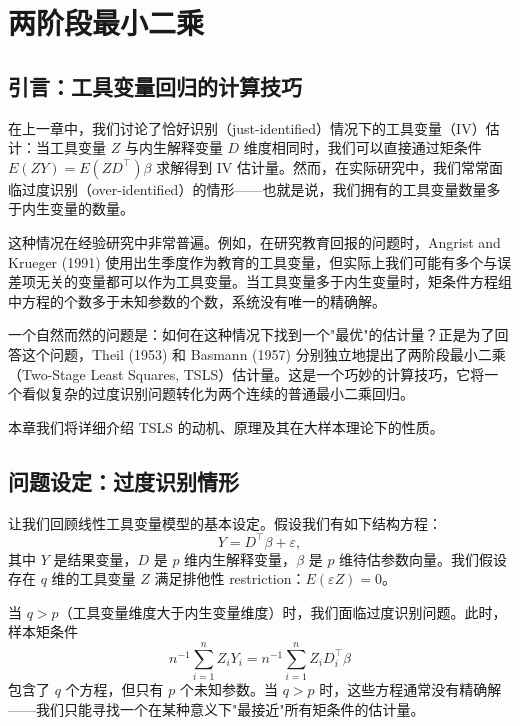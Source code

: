 \chapter{两阶段最小二乘}\label{ch:23}\label{chap:TSLS}

\section{引言：工具变量回归的计算技巧}\label{sec:TSLS-intro}

在上一章中，我们讨论了恰好识别（just-identified）情况下的工具变量（IV）估计：当工具变量 $Z$ 与内生解释变量 $D$ 维度相同时，我们可以直接通过矩条件 $E(ZY)=E(ZD^{\top})\beta$ 求解得到 IV 估计量。然而，在实际研究中，我们常常面临过度识别（over-identified）的情形——也就是说，我们拥有的工具变量数量多于内生变量的数量。

这种情况在经验研究中非常普遍。例如，在研究教育回报的问题时，Angrist and Krueger (1991) 使用出生季度作为教育的工具变量，但实际上我们可能有多个与误差项无关的变量都可以作为工具变量。当工具变量多于内生变量时，矩条件方程组中方程的个数多于未知参数的个数，系统没有唯一的精确解。

一个自然而然的问题是：如何在这种情况下找到一个"最优"的估计量？正是为了回答这个问题，Theil (1953) 和 Basmann (1957) 分别独立地提出了两阶段最小二乘（Two-Stage Least Squares, TSLS）估计量。这是一个巧妙的计算技巧，它将一个看似复杂的过度识别问题转化为两个连续的普通最小二乘回归。

本章我们将详细介绍 TSLS 的动机、原理及其在大样本理论下的性质。

\section{问题设定：过度识别情形}\label{sec:over-identified}

让我们回顾线性工具变量模型的基本设定。假设我们有如下结构方程：
\begin{equation}
Y = D^{\top}\beta + \varepsilon, \label{eq:23.1}
\end{equation}
其中 $Y$ 是结果变量，$D$ 是 $p$ 维内生解释变量，$\beta$ 是 $p$ 维待估参数向量。我们假设存在 $q$ 维的工具变量 $Z$ 满足排他性 restriction：$E(\varepsilon Z)=0$。

当 $q>p$（工具变量维度大于内生变量维度）时，我们面临过度识别问题。此时，样本矩条件
\begin{equation}
n^{-1}\sum_{i=1}^{n}Z_{i}Y_{i}=n^{-1}\sum_{i=1}^{n}Z_{i}D_{i}^{\top}\beta \label{eq:23.2}
\end{equation}
包含了 $q$ 个方程，但只有 $p$ 个未知参数。当 $q>p$ 时，这些方程通常没有精确解——我们只能寻找一个在某种意义下"最接近"所有矩条件的估计量。

